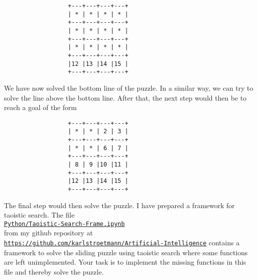  \begin{verbatim}
                  +---+---+---+---+
                  | * | * | * | * |
                  +---+---+---+---+
                  | * | * | * | * |
                  +---+---+---+---+
                  | * | * | * | * |
                  +---+---+---+---+
                  |12 |13 |14 |15 |
                  +---+---+---+---+
 \end{verbatim}
 We have now solved the bottom line of the puzzle.  In a similar way, we can try to solve the line above the
 bottom line.  After that, the next step would then be to reach a goal of the form
 \begin{verbatim}
                  +---+---+---+---+
                  | * | * | 2 | 3 |
                  +---+---+---+---+
                  | * | * | 6 | 7 |
                  +---+---+---+---+
                  | 8 | 9 |10 |11 |
                  +---+---+---+---+
                  |12 |13 |14 |15 |
                  +---+---+---+---+
\end{verbatim}
The final step would then solve the puzzle.  I have prepared a framework for taoistic search.  The file
\\[0.2cm]
\hspace*{1.5cm}
\href{https://github.com/karlstroetmann/Artificial-Intelligence/blob/master/Python/Taoistic-Search-Frame.ipynb}{\texttt{Python/Taoistic-Search-Frame.ipynb}}
\\[0.2cm]
from my github repository at
\href{https://github.com/karlstroetmann/Artificial-Intelligence/}{\texttt{https://github.com/karlstroetmann/Artificial-Intelligence}} \linebreak
contains a framework to solve the sliding puzzle using taoistic search where some functions are left unimplemented.  
 Your task is to implement the missing functions in this file and thereby solve the puzzle.
 \eox


